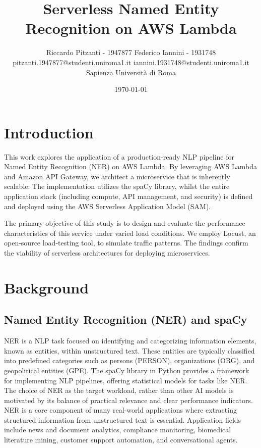 \documentclass[11pt,a4paper]{article}
\title{\vspace{-1.5em}\Large\bfseries Serverless Named Entity Recognition on AWS Lambda}
\author{Riccardo Pitzanti - 1947877 \quad \quad \quad \quad Federico Iannini - 1931748\\
  \normalsize pitzanti.1947877@studenti.uniroma1.it \quad iannini.1931748@studenti.uniroma1.it\\[0.25em]
  \normalsize Sapienza Università di Roma}
\date{\normalsize \today}
\begin{document}
\maketitle
\vspace{-1.5em}

\section{Introduction}
This work explores the application of a production-ready NLP pipeline for Named Entity Recognition (NER) on AWS Lambda. By leveraging AWS Lambda and Amazon API Gateway, we architect a microservice that is inherently scalable. The implementation utilizes the spaCy library, whilst the entire application stack (including compute, API management, and security) is defined and deployed using the AWS Serverless Application Model (SAM).

The primary objective of this study is to design and evaluate the performance characteristics of this service under varied load conditions. We employ Locust, an open-source load-testing tool, to simulate traffic patterns. The findings confirm the viability of serverless architectures for deploying microservices.

\section{Background}

\subsection{Named Entity Recognition (NER) and spaCy}
NER is a NLP task focused on identifying and categorizing information elements, known as entities, within unstructured text. These entities are typically classified into predefined categories such as persons (\textsf{PERSON}), organizations (\textsf{ORG}), and geopolitical entities (\textsf{GPE}). The spaCy library in Python provides a framework for implementing NLP pipelines, offering statistical models for tasks like NER.
The choice of NER as the target workload, rather than other AI models is motivated by its balance of practical relevance and clear performance indicators. NER is a core component of many real-world applications where extracting structured information from unstructured text is essential. Application fields include news and document analytics, compliance monitoring, biomedical literature mining, customer support automation, and conversational agents.
\end{document}
